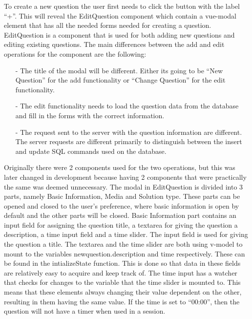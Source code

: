 \noindent
To create a new question the user first needs to click the button with the label “+”. This will reveal the EditQuestion component which contain a vue-modal element that has all the needed forms needed for creating a question. EditQuestion is a component that is used for both adding new questions and editing existing questions. The main differences between the add and edit operations for the component are the following:
\begin{itemize}
\item[-] The title of the modal will be different. Either its going to be “New Question” for the add functionality or “Change Question” for the edit functionality.
\item[-] The edit functionality needs to load the question data from the database and fill in the forms with the correct information. 
\item[-] The request sent to the server with the question information are different. The server requests are different primarily to distinguish between the insert and update SQL commands used on the database.
\end{itemize} 
Originally there were 2 components used for the two operations, but this was later changed in development because having 2 components that were practically the same was deemed unnecessary. The modal in EditQuestion is divided into 3 parts, namely Basic Information, Media and Solution type.  These parts can be opened and closed to the user’s preference, where basic information is open by default and the other parts will be closed. Basic Information part contains an input field for assigning the question title, a textarea for giving the question a description, a time input field and a time slider. The input field is used for giving the question a title. The textarea and the time slider are both using v-model to mount to the variables newquestion.description and time respectively. These can be found in the intializeState function. This is done so that data in these fields are relatively easy to acquire and keep track of. The time input has a watcher that checks for changes to the variable that the time slider is mounted to. This means that these elements always changing their value dependent on the other, resulting in them having the same value. If the time is set to “00:00”, then the question will not have a timer when used in a session.
\\[11pt]

